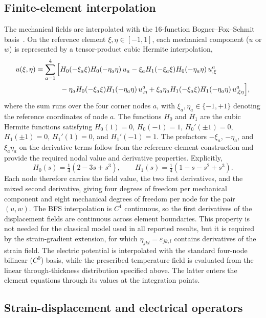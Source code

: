 \documentclass[a4paper,12pt]{elsarticle}
\begin{document}
\subsection{Finite-element interpolation}
\label{sec:discretization}

The mechanical fields are interpolated with the 16-function Bogner--Fox--Schmit
basis~\cite{Bogner1965}. On the reference element
$\xi,\eta\in[-1,1]$, each mechanical component ($u$ or $w$) is represented by a
tensor-product cubic Hermite interpolation,
\begin{align}
u(\xi,\eta)=\sum_{a=1}^{4}\Big[&
H_0(-\xi_a\xi)H_0(-\eta_a\eta)\,u_a
-\xi_aH_1(-\xi_a\xi)H_0(-\eta_a\eta)\,u_{,\xi}^a\notag\\
&-\eta_aH_0(-\xi_a\xi)H_1(-\eta_a\eta)\,u_{,\eta}^a
+\xi_a\eta_aH_1(-\xi_a\xi)H_1(-\eta_a\eta)\,u_{,\xi\eta}^a\Big],
\label{eq:bfs-interp}
\end{align}
where the sum runs over the four corner nodes $a$, with
$\xi_a,\eta_a\in\{-1,+1\}$ denoting the reference coordinates of node $a$.
The functions $H_0$ and $H_1$ are the cubic Hermite functions satisfying
$H_0(1)=0$, $H_0(-1)=1$, $H_0'(\pm1)=0$,
$H_1(\pm1)=0$, $H_1'(1)=0$, and $H_1'(-1)=1$. The prefactors
$-\xi_a$, $-\eta_a$, and $\xi_a\eta_a$ on the derivative terms follow from the
reference-element construction and provide the required nodal value and derivative
properties. Explicitly,
\begin{equation}
H_0(s)=\tfrac14(2-3s+s^3),\qquad
H_1(s)=\tfrac14(1-s-s^2+s^3).
\label{eq:hermite}
\end{equation}
Each node therefore carries the field value, the two first derivatives, and the mixed
second derivative, giving four degrees of freedom per mechanical component and eight
mechanical degrees of freedom per node for the pair $(u,w)$. The BFS interpolation is
$C^1$ continuous, so the first derivatives of the displacement fields are continuous
across element boundaries. This property is not needed for the classical model used in all reported results, but it is required by the strain-gradient extension,
for which $\eta_{jkl}=\varepsilon_{jk,l}$ contains derivatives of the strain field.
The electric potential is interpolated with the standard four-node bilinear ($C^0$)
basis, while the prescribed temperature field is evaluated from the linear
through-thickness distribution specified above. The latter enters
the element equations through its values at the integration points.

\subsection{Strain-displacement and electrical operators}
\label{sec:Bops}
\end{document}
